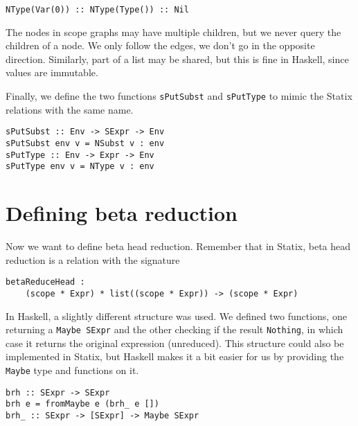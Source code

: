 \begin{lstlisting}
NType(Var(0)) :: NType(Type()) :: Nil
\end{lstlisting}

The nodes in scope graphs may have multiple children, but we never query the children of a node. We only follow the edges, we don't go in the opposite direction. Similarly, part of a list may be shared, but this is fine in Haskell, since values are immutable. 

Finally, we define the two functions \verb|sPutSubst| and \verb|sPutType| to mimic the Statix relations with the same name.
\begin{lstlisting}
sPutSubst :: Env -> SExpr -> Env
sPutSubst env v = NSubst v : env
sPutType :: Env -> Expr -> Env
sPutType env v = NType v : env
\end{lstlisting}

\section{Defining beta reduction}

Now we want to define beta head reduction. Remember that in Statix, beta head reduction is a relation with the signature
\begin{lstlisting}
betaReduceHead : 
	(scope * Expr) * list((scope * Expr)) -> (scope * Expr)
\end{lstlisting}

In Haskell, a slightly different structure was used. We defined two functions, one returning a \verb|Maybe SExpr| and the other checking if the result \verb|Nothing|, in which case it returns the original expression (unreduced). This structure could also be implemented in Statix, but Haskell makes it a bit easier for us by providing the \verb|Maybe| type and functions on it.
\begin{lstlisting}
brh :: SExpr -> SExpr
brh e = fromMaybe e (brh_ e [])
brh_ :: SExpr -> [SExpr] -> Maybe SExpr
\end{lstlisting}

